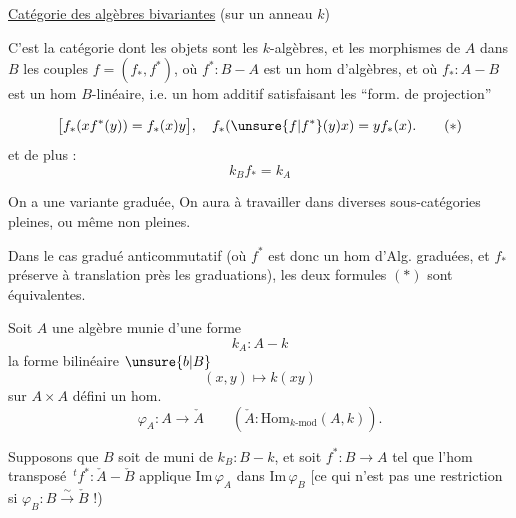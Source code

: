 \uline{Catégorie des algèbres bivariantes} (sur un anneau $k$)

C'est la catégorie dont les objets sont les $k$-algèbres, et les morphismes de $A$ dans $B$ les couples $f=(f_*,f^*)$, où $f^*:B-A$ est un hom d'algèbres, et où $f_*:A-B$ est un hom $B$-linéaire, i.e. un hom additif satisfaisant les ``form. de projection''

\[
\bigl[f_*(x f^*(y))=f_*(x)y\bigr],\quad f_*(\unsure{f|f^*}(y)x)=y f_*(x). \tag*{$(\ast)$}
\]
et de plus :
\[
k_B f_*=k_A \tag*{$(\ast\ast)$}
\]

On a une variante graduée,  On aura à travailler dans diverses sous-catégories pleines, ou même non pleines.

Dans le cas gradué anticommutatif (où $f^*$ est donc un hom d'Alg. graduées, et  $f_*$ préserve à translation près  les graduations), les deux formules $(\ast)$ sont équivalentes.


Soit $A$ une algèbre munie d'une forme
\[
k_A:A-k
\]
  la forme bilinéaire $\unsure{b|B}$
\[
(x,y)\longmapsto k(xy)
\]
sur $A\times A$  défini un  hom. 
\[
\varphi_A:A\longrightarrow\check A\qquad(\check A:\mathrm{Hom}_{k\text{-}\mathrm{mod}}(A,k)).
\]

Supposons que $B$ soit de  muni de $k_B:B-k$,  et soit $f^*:B\longrightarrow A$ tel que l'hom transposé $\,{}^{t}f^*:\check A-\check B$ applique $\mathrm{Im}\,\varphi_A$ dans $\mathrm{Im}\,\varphi_B$ [ce qui n'est pas une restriction si $\varphi_B:B\xrightarrow{\sim}\check B$ !)

